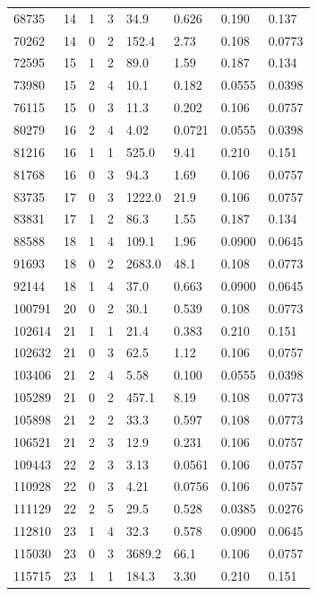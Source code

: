 \documentclass[preview]{standalone}
\begin{document}
{{{\begin{tabular}{L{1.2cm}C{1.2cm} C{0.3cm}C{0.5cm} C{1.4cm}C{1.4cm} C{1.4cm}C{1.4cm}}
  68735  &    14  & 1     &  3 &  34.9  & 0.626  & 0.190 &  0.137   \\ 
  70262  &    14  & 0     &  2 &  152.4  & 2.73  & 0.108 &  0.0773   \\ 
  72595  &    15  & 1     &  2 &  89.0  & 1.59  & 0.187 &  0.134   \\ 
  73980  &    15  & 2     &  4 &  10.1  & 0.182  & 0.0555 &  0.0398   \\ 
  76115  &    15  & 0     &  3 &  11.3  & 0.202  & 0.106 &  0.0757   \\ 
  80279  &    16  & 2     &  4 &  4.02  & 0.0721  & 0.0555 &  0.0398   \\ 
  81216  &    16  & 1     &  1 &  525.0  & 9.41  & 0.210 &  0.151   \\ 
  81768  &    16  & 0     &  3 &  94.3  & 1.69  & 0.106 &  0.0757   \\ 
  83735  &    17  & 0     &  3 &  1222.0  & 21.9  & 0.106 &  0.0757   \\ 
  83831  &    17  & 1     &  2 &  86.3  & 1.55  & 0.187 &  0.134   \\ 
  88588  &    18  & 1     &  4 &  109.1  & 1.96  & 0.0900 &  0.0645   \\ 
  91693  &    18  & 0     &  2 &  2683.0  & 48.1  & 0.108 &  0.0773   \\ 
  92144  &    18  & 1     &  4 &  37.0  & 0.663  & 0.0900 &  0.0645   \\ 
  100791  &    20  & 0     &  2 &  30.1  & 0.539  & 0.108 &  0.0773   \\ 
  102614  &    21  & 1     &  1 &  21.4  & 0.383  & 0.210 &  0.151   \\ 
  102632  &    21  & 0     &  3 &  62.5  & 1.12  & 0.106 &  0.0757   \\ 
  103406  &    21  & 2     &  4 &  5.58  & 0.100  & 0.0555 &  0.0398   \\ 
  105289  &    21  & 0     &  2 &  457.1  & 8.19  & 0.108 &  0.0773   \\ 
  105898  &    21  & 2     &  2 &  33.3  & 0.597  & 0.108 &  0.0773   \\ 
  106521  &    21  & 2     &  3 &  12.9  & 0.231  & 0.106 &  0.0757   \\ 
  109443  &    22  & 2     &  3 &  3.13  & 0.0561  & 0.106 &  0.0757   \\ 
  110928  &    22  & 0     &  3 &  4.21  & 0.0756  & 0.106 &  0.0757   \\ 
  111129  &    22  & 2     &  5 &  29.5  & 0.528  & 0.0385 &  0.0276   \\ 
  112810  &    23  & 1     &  4 &  32.3  & 0.578  & 0.0900 &  0.0645   \\ 
  115030  &    23  & 0     &  3 &  3689.2  & 66.1  & 0.106 &  0.0757   \\ 
  115715  &    23  & 1     &  1 &  184.3  & 3.30  & 0.210 &  0.151   \\ 
\hline 
\end{tabular} 

}}}
\end{document}

